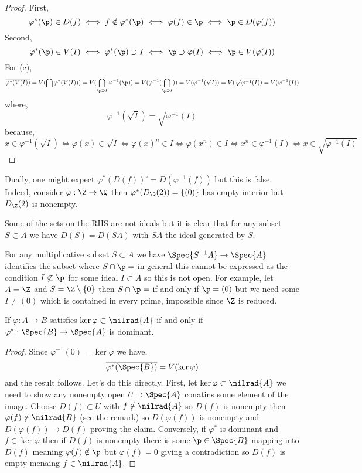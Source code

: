 \documentclass[12pt]{article}
\begin{document}
\begin{proof}
First,
\[ \varphi^*(\p) \in D(f) \iff f \notin \varphi^*(\p) \iff \varphi(f) \in \p \iff \p \in D(\varphi(f)) \]
Second,
\[ \varphi^*(\p) \in V(I) \iff \varphi^*(\p) \supset I \iff \p \supset \varphi(I) \iff \p \in V(\varphi(I)) \]
For (c),
\[ \overline{\varphi^*(V(I))} = V(\bigcap \varphi^*(V(I))) = V(\bigcap_{\p \supset I} \varphi^{-1}(\p)) = V(\varphi^{-1}(\bigcap_{\p \supset I})) = V(\varphi^{-1}(\sqrt{I})) = V(\sqrt{\varphi^{-1}(I)}) = V(\varphi^{-1}(I)) \]
where,
\[ \varphi^{-1}(\sqrt{I}) = \sqrt{\varphi^{-1}(I)} \]
because,
\[ x \in \varphi^{-1}(\sqrt{I}) \iff \varphi(x) \in \sqrt{I} \iff \varphi(x)^n \in I \iff \varphi(x^n) \in I \iff x^n \in \varphi^{-1}(I) \iff x \in \sqrt{\varphi^{-1}(I)} \]
\end{proof}

\begin{rmk}
Dually, one might expect $\varphi^*(D(f))^\circ = D(\varphi^{-1}(f))$ but this is false. Indeed, consider $\varphi : \Z \to \Q$ then $\varphi^*(D_{\Q}(2)) = \{ (0) \}$ has empty interior but $D_{\Z}(2)$ is nonempty. 
\end{rmk}

\begin{rmk}
Some of the sets on the RHS are not ideals but it is clear that for any subset $S \subset A$ we have $D(S) = D(S A)$ with $SA$ the ideal generated by $S$.
\end{rmk}

\begin{rmk}
For any multiplicative subset $S \subset A$ we have $\Spec{S^{-1} A} \to \Spec{A}$ identifies the subset where $S \cap \p = \empty$ in general this cannot be expressed as the condition $I \not\subset \p$ for some ideal $I \subset A$ so this is not open. For example, let $A = \Z$ and $S = \Z \setminus \{ 0 \}$ then $S \cap \p = \empty$ if and only if $\p = (0)$ but we need some $I \neq (0)$ which is contained in every prime, impossible since $\Z$ is reduced. 
\end{rmk}

\begin{cor}
If $\varphi : A \to B$ satisfies $\ker{\varphi} \subset \nilrad{A}$ if and only if $\varphi^* : \Spec{B} \to \Spec{A}$ is dominant. 
\end{cor}

\begin{proof}
Since $\varphi^{-1}(0) = \ker{\varphi}$ we have,
\[ \overline{\varphi^*(\Spec{B})} = V(\ker{\varphi}) \]
and the result follows. Let's do this directly. First, let $\ker{\varphi} \subset \nilrad{A}$ we need to show any nonempty open $U \supset \Spec{A}$ conatins some element of the image. Choose $D(f) \subset U$ with $f \notin \nilrad{A}$ so $D(f)$ is nonempty then $\varphi(f) \notin \nilrad{B}$ (see the remark) so $D(\varphi(f))$ is nonempty and $D(\varphi(f)) \to D(f)$ proving the claim. Conversely, if $\varphi^*$ is dominant and $f \in \ker{\varphi}$ then if $D(f)$ is nonempty there is some $\p \in \Spec{B}$ mapping into $D(f)$ meaning $\varphi(f) \notin \p$ but $\varphi(f) = 0$ giving a contradiction so $D(f)$ is empty menaing $f \in \nilrad{A}$.
\end{proof}
\end{document}
